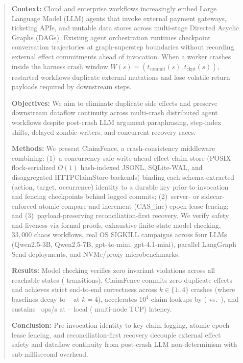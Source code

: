 \documentclass[10pt,journal]{IEEEtran}
\def\CF{ClaimFence}%
\def\texttt#1{#1}%
\theoremstyle{definition}
\theoremstyle{remark}
\newcommand{\CF}{\textsc{ClaimFence}}
\begin{document}
\begin{abstract}
\textbf{Context:} Cloud and enterprise workflows increasingly embed Large Language Model (LLM) agents that invoke external payment gateways, ticketing APIs, and mutable data stores across multi-stage Directed Acyclic Graphs (DAGs). Existing agent orchestration runtimes checkpoint conversation trajectories at graph-superstep boundaries without recording external effect commitments ahead of invocation. When a worker crashes inside the harness crash window $W(s) = (t_{\mathrm{commit}}(s), t_{\mathrm{ckpt}}(s))$, restarted workflows duplicate external mutations and lose volatile return payloads required by downstream steps.

\textbf{Objectives:} We aim to eliminate duplicate side effects and preserve downstream dataflow continuity across multi-crash distributed agent workflows despite post-crash LLM argument paraphrasing, step-index shifts, delayed zombie writers, and concurrent recovery races.

\textbf{Methods:} We present \CF{}, a crash-consistency middleware combining: (1)~a concurrency-safe write-ahead effect-claim store (POSIX \texttt{flock}-serialized $O(1)$ hash-indexed \texttt{JSONL}, \texttt{SQLite-WAL}, and disaggregated \texttt{HTTPClaimStore} backends) binding each schema-extracted \texttt{(action, target, occurrence)} identity to a durable key prior to invocation and fencing checkpoints behind logged commits; (2)~server- or sidecar-enforced atomic compare-and-increment (\texttt{CAS\_inc}) epoch-lease fencing; and (3)~payload-preserving reconciliation-first recovery. We verify safety and liveness via formal proofs, exhaustive finite-state model checking, $33{,}000$ chaos workflows, real OS \texttt{SIGKILL} campaigns across four LLMs (\texttt{Qwen2.5-3B}, \texttt{Qwen2.5-7B}, \texttt{gpt-4o-mini}, \texttt{gpt-4.1-mini}), parallel \texttt{LangGraph} \texttt{Send} deployments, and NVMe/proxy microbenchmarks.

\textbf{Results:} Model checking verifies zero invariant violations across all \MCCFStates{} reachable states (\MCCFEdges{} transitions). \CF{} commits zero duplicate effects and achieves \ChaosCFStrict{} strict end-to-end correctness across $k \in \{1..4\}$ crashes (where baselines decay to \SweepKFourBase{}--\SweepKFourCanon{} at $k=4$), accelerates $10^4$-claim lookups by \ScaleTenKSpeedup{} (\ScaleTenKCFUs{} vs.\ \ScaleTenKLegacyMs{}), and sustains \HttpPeakOps{}~ops/s at \LatSQLiteStepPFifty{}--\LatFsyncStepPFifty{} local (\LatNetStepPFifty{} multi-node TCP) latency.

\textbf{Conclusion:} Pre-invocation identity-to-key claim logging, atomic epoch-lease fencing, and reconciliation-first recovery decouple external effect safety and dataflow continuity from post-crash LLM non-determinism with sub-millisecond overhead.
\end{abstract}
\end{document}

